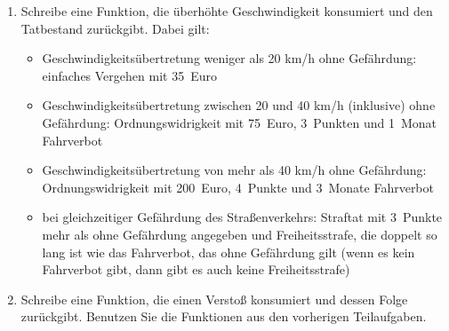 \begin{aufgabe}
\begin{enumerate}
  \item Schreibe eine Funktion, die überhöhte
    Geschwindigkeit konsumiert und den Tatbestand zurückgibt.  Dabei
    gilt:
    \begin{itemize}
    \item Geschwindigkeitsübertretung weniger als 20 km/h ohne Gefährdung:
      einfaches Vergehen mit 35~Euro
    \item Geschwindigkeitsübertretung zwischen 20 und 40 km/h
      (inklusive) ohne Gefährdung: Ordnungswidrigkeit mit 75~Euro,
      3~Punkten und 1~Monat Fahrverbot
    \item Geschwindigkeitsübertretung von mehr als 40 km/h ohne
      Gefährdung: Ordnungswidrigkeit mit 200~Euro, 4~Punkte und
      3~Monate Fahrverbot
    \item bei gleichzeitiger Gefährdung des Straßenverkehrs: Straftat
      mit 3~Punkte mehr als ohne Gefährdung angegeben und
      Freiheitsstrafe, die doppelt so lang ist wie das Fahrverbot, das
      ohne Gefährdung gilt (wenn es kein Fahrverbot gibt, dann gibt es
      auch keine Freiheitsstrafe)
    \end{itemize}

  \item Schreibe eine Funktion, die einen
    Verstoß konsumiert und dessen Folge zurückgibt.  Benutzen Sie die
    Funktionen aus den vorherigen Teilaufgaben.
  \end{enumerate}
\end{aufgabe}


